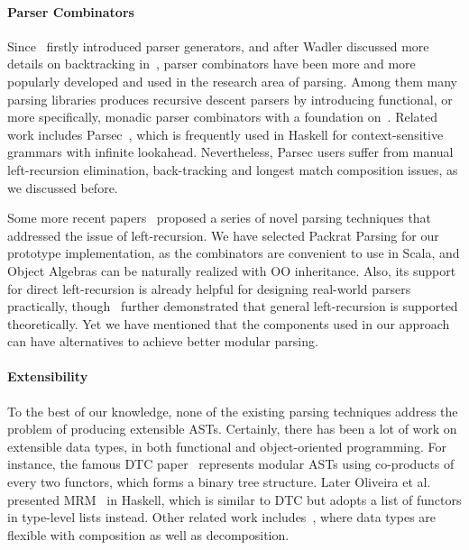 \paragraph{Parser Combinators} Since~\cite{burge1975} firstly
introduced parser generators, and after Wadler discussed more details
on backtracking in~\cite{Wadler1985}, parser combinators have been
more and more popularly developed and used in the research area of
parsing. Among them many parsing libraries produces recursive descent
parsers by introducing functional, or more specifically, monadic
parser combinators with a foundation on~\cite{nott237}. Related work
includes Parsec~\cite{Leijen2001}, which is frequently used in Haskell
for context-sensitive grammars with infinite lookahead. Nevertheless,
Parsec users suffer from manual left-recursion elimination, back-tracking and
longest match composition issues, as we discussed before.

Some more recent papers~\cite{Ford2002,Might2011,Frost2008} proposed a series of
novel parsing techniques that addressed the issue
of left-recursion. We have selected Packrat
Parsing for our prototype implementation, as the combinators are
convenient to use in Scala, and Object Algebras can be naturally realized with
OO inheritance. Also, its support
for direct left-recursion is already helpful for designing real-world
parsers practically, though~\cite{warth2008} further demonstrated that
general left-recursion is supported theoretically.
Yet we have mentioned that the components used in our approach
can have alternatives to achieve better modular parsing.




\paragraph{Extensibility} To the best of our knowledge, none of the existing parsing techniques
address the problem of producing extensible ASTs. Certainly, there has been a lot of work on extensible
data types, in both functional and object-oriented programming.
For instance, the famous DTC paper~\cite{swierstra2008} represents
modular ASTs using co-products of every two functors, which forms a
binary tree structure. Later
Oliveira et al. presented MRM~\cite{Oliveira2015} in Haskell, which is
similar to DTC but adopts a list of functors in type-level lists
instead. Other related work
includes~\cite{Bahr2014}, where data types are flexible with
composition as well as decomposition.

